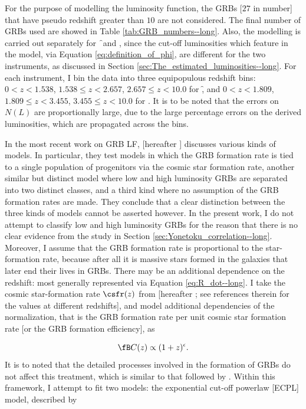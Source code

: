 For the purpose of modelling the luminosity function, the GRBs [$27$ in number] that have pseudo redshift greater than $10$ are not considered. The final number of GRBs used are showed in Table \ref{tab:GRB_numbers--long}. Also, the modelling is carried out separately for \f\ and \s, since the cut-off luminosities which feature in the model, via Equation \ref{eq:definition_of_phi}, are different for the two instruments, as discussed in Section \ref{sec:The_estimated_luminosities--long}. For each instrument, I bin the data into three equipopulous redshift bins: $0 < z <1.538$, $1.538 \leq z < 2.657$, $2.657 \leq z < 10.0$ for \f, and $0 < z < 1.809$, $1.809 \leq z <3.455$, $3.455 \leq z < 10.0$ for \s. It is to be noted that the errors on $N(L)$ are proportionally large, due to the large percentage errors on the derived luminosities, which are propagated across the bins.

In the most recent work on GRB LF, \cite{Amaral-Rogers_et_al.-2017-MNRAS} [hereafter ] discusses various kinds of models. In particular, they test models in which the GRB formation rate is tied to a single population of progenitors via the cosmic star formation rate, another similar but distinct model where low and high luminosity GRBs are separated into two distinct classes, and a third kind where no assumption of the GRB formation rates are made. They conclude that a clear distinction between the three kinds of models cannot be asserted however. In the present work, I do not attempt to classify low and high luminosity GRBs for the reason that there is no clear evidence from the study in Section \ref{sec:Yonetoku_correlation--long}. Moreover, I assume that the GRB formation rate is proportional to the star-formation rate, because after all it is massive stars formed in the galaxies that later end their lives in GRBs. There may be an additional dependence on the redshift: most generally represented via Equation \ref{eq:R_dot--long}. I take the cosmic star-formation rate $\csfr (z)$ from \cite{Bouwens_et_al.-2015-ApJ} [hereafter ; see references therein for the values at different redshifts], and model additional dependencies of the normalization, that is the GRB formation rate per unit cosmic star formation rate [or the GRB formation efficiency], as 

\begin{equation}
\fB C(z) \propto (1+z)^{\epsilon}.
\label{eq:fB.C_of_z--long}
\end{equation} It is to noted that the detailed processes involved in the formation of GRBs do not affect this treatment, which is similar to that followed by . Within this framework, I attempt to fit two models: the exponential cut-off powerlaw [ECPL] model, described by

